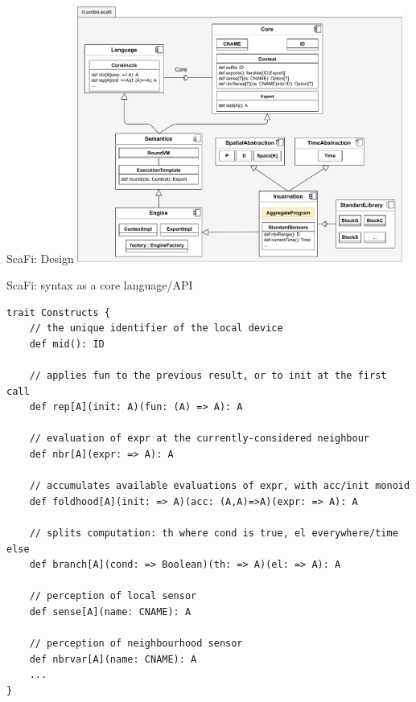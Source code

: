 \documentclass[presentation, 9pt]{beamer}\mode<presentation>{\usetheme{AMSBolognaFC}}
\begin{document}
\begin{frame}{ScaFi: Design}
\centering
\includegraphics[width=0.8\textwidth]{img/scafi-design.drawio.pdf}
\end{frame}
\begin{frame}[fragile]{ScaFi: syntax as a core language/API}

\begin{verbatim}
trait Constructs {
	// the unique identifier of the local device 
	def mid(): ID
	
	// applies fun to the previous result, or to init at the first call
	def rep[A](init: A)(fun: (A) => A): A
	
	// evaluation of expr at the currently-considered neighbour
	def nbr[A](expr: => A): A
	
	// accumulates available evaluations of expr, with acc/init monoid
	def foldhood[A](init: => A)(acc: (A,A)=>A)(expr: => A): A
	
	// splits computation: th where cond is true, el everywhere/time else
	def branch[A](cond: => Boolean)(th: => A)(el: => A): A
	
	// perception of local sensor
	def sense[A](name: CNAME): A
	
	// perception of neighbourhood sensor
	def nbrvar[A](name: CNAME): A
	...
}
\end{verbatim}
\end{frame}
\end{document}
